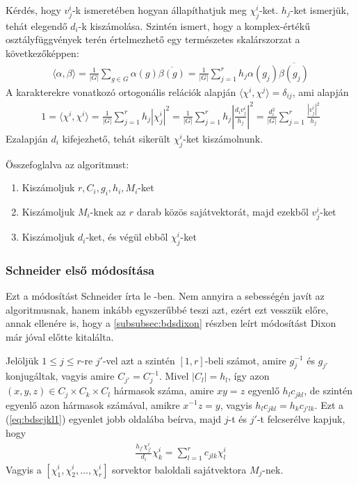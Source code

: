 Kérdés, hogy $v^i_j$-k ismeretében hogyan állapíthatjuk meg $\chi^i_j$-ket.
$h_j$-ket ismerjük, tehát elegendő $d_i$-k kiszámolása.
Szintén ismert, hogy a komplex-értékű osztályfüggvények terén értelmezhető egy természetes skalárszorzat a következőképpen:
\begin{align}
\label{eq:bdsscalar}
\langle \alpha, \beta \rangle = \frac{1}{|G|}\sum_{g\in G}\alpha(g)\overline{\beta(g)} = \frac{1}{|G|}\sum_{j=1}^r h_j \alpha(g_j) \overline{\beta(g_j)}
\end{align}
A karakterekre vonatkozó ortogonális relációk alapján $\langle \chi^i, \chi^j \rangle = \delta_{ij}$, ami alapján
\begin{align}
\label{eq:bdsdi1}
1 = \langle \chi^i, \chi^i \rangle = \frac{1}{|G|}\sum_{j=1}^r h_j |\chi^i_j|^2 = \frac{1}{|G|}\sum_{j=1}^r h_j \left|\frac{d_i v^i_j}{h_j}\right|^2 = 
\frac{d_i^2}{|G|}\sum_{j=1}^r \frac{|v^i_j|^2}{h_j}
\end{align}
Ezalapján $d_i$ kifejezhető, tehát sikerült $\chi^i_j$-ket kiszámolnunk.

\noindent
Összefoglalva az algoritmust:
\begin{enumerate}
\item Kiszámoljuk $r, C_i, g_i, h_i, M_i$-ket
\item Kiszámoljuk $M_i$-knek az $r$ darab közös sajátvektorát, majd ezekből $v^i_j$-ket
\item Kiszámoljuk $d_i$-ket, és végül ebből $\chi^i_j$-ket
\end{enumerate}

\subsubsection{Schneider első módosítása}
\label{subsubsec:bdssch1}
Ezt a módosítást Schneider írta le \cite{Sch90}-ben.
Nem annyira a sebességén javít az algoritmusnak, hanem inkább egyszerűbbé teszi azt, ezért ezt vesszük előre,
annak ellenére is, hogy a \ref{subsubsec:bdsdixon} részben leírt módosítást Dixon már jóval előtte kitalálta.

Jelöljük $1\le j \le r$-re $j'$-vel azt a szintén $[1, r]$-beli számot, amire $g_j^{-1}$ és $g_{j'}$ konjugáltak,
vagyis amire $C_{j'}=C_j^{-1}$. Mivel $|C_l|=h_l$, így azon $(x, y, z)\in C_j \times C_k \times C_l$ hármasok száma,
amire $xy=z$ egyenlő $h_l c_{jkl}$, de szintén egyenlő azon hármasok számával, amikre $x^{-1}z=y$, vagyis $h_l c_{jkl}=h_k c_{j'lk}$.
Ezt a (\ref{eq:bdscjkl1}) egyenlet jobb oldalába beírva, majd $j$-t és $j'$-t felcserélve kapjuk, hogy
\begin{align}
\label{eq:bdssch1}
\frac{h_{j'}\chi^i_{j'}}{d_i}\chi^i_k=\sum_{l=1}^r c_{jlk}\chi^i_l
\end{align}
Vagyis a $[\chi^i_1, \chi^i_2, \dots, \chi^i_r]$ sorvektor baloldali sajátvektora $M_j$-nek.

